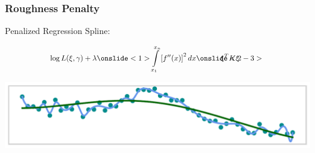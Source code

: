 \documentclass[final]{beamer}
\newcommand{\inserteqstrut}[1]{%
  \rlap{$\displaystyle#1$}%
  \phantom{\biggesteq}}
\begin{document}
\renewcommand{\biggesteq}{\int\limits_{x_1}^{x_n} \left[ f''(x)\right]^2dx}
\begin{frame}[b]
\frametitle{Roughness Penalty}

Penalized Regression Spline: 

\begin{overprint}
\begin{align*}
\mkern105mu \log L(\xi, \gamma) + \lambda
    \onslide<1>{\inserteqstrut{ \int\limits_{x_1}^{x_n} \left[ f''(x)\right]^2dx}}
    \onslide<2-3>{\inserteqstrut{ \mkern-105mu \xi^T K \xi}}
\end{align*}
\end{overprint}



\begin{minipage}[b][2em][b]{\textwidth}


\begin{overprint}
\begin{flushleft}
\end{flushleft}
\vspace{-2em}
\end{overprint}

\end{minipage}

\begin{center}
\includegraphics[width=\textwidth]{Images/wiggly}
\end{center}

\end{frame}
\end{document}

